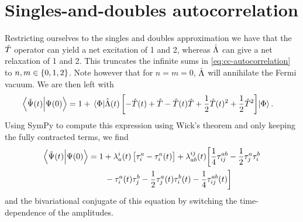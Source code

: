     \section{Singles-and-doubles autocorrelation}
        Restricting ourselves to the singles and doubles approximation we have
        that the $\hat{T}$ operator can yield a net excitation of 1 and 2,
        whereas $\hat{\Lambda}$ can give a net relaxation of 1 and 2.
        This truncates the infinite sums in \autoref{eq:cc-autocorrelation} to
        $n, m \in \left\{ 0, 1, 2 \right\}$.
        Note however that for $n = m = 0$, $\hat{\Lambda}$ will annihilate the Fermi
        vacuum.
        We are then left with
        \begin{align}
            \braket{\tilde{\Psi}(t)}{\Psi(0)}
            &= 1
            + \mel{\Phi}{
                \hat{\Lambda}(t)\left[ 
                    - \hat{T}(t) + \hat{T}- \hat{T}(t)\hat{T}+ \frac{1}{2}\hat{T}(t)^2 + \frac{1}{2}\hat{T}^2
                 \right]
            }{\Phi}.
        \end{align}
        Using SymPy \cite{sympy} to compute this expression using Wick's theorem
        and only keeping the fully contracted terms, we find
        \begin{align}
            \braket{\tilde{\Psi}(t)}{\Psi(0)}
            &=
            1
            + \lambda^{i}_{a}(t) \left[ 
                \tau^{a}_{i} - \tau^{a}_{i}(t)
             \right]
            + \lambda^{ij}_{ab}(t) \biggl[
                \frac{1}{4}\tau^{ab}_{ij}
                - \frac{1}{2} \tau^{a}_{j} \tau^{b}_{i}
                \nonumber \\
                &\qquad
                - \tau^{a}_{i}(t) \tau^{b}_{j}
                - \frac{1}{2} \tau^{a}_{j}(t) \tau^{b}_{i}(t)
                - \frac{1}{4} \tau^{ab}_{ij}(t)
            \biggr]
        \end{align}
        and the bivariational conjugate of this equation by switching the
        time-dependence of the amplitudes.
